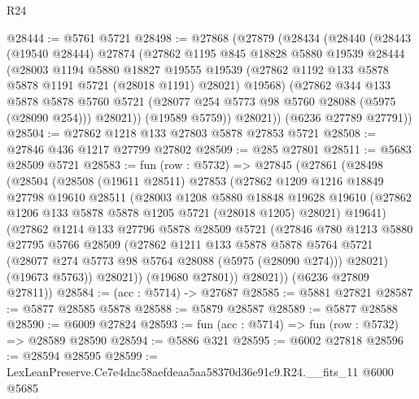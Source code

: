 \begin{lexlean}{R24}
\begin{coremodule}
@28444 := @5761 @5721
@28498 := @27868
    (@27879
      (@28434
        (@28440
          (@28443
            (@19540 @28444)
            @27874
            (@27862
              @1195
              @845
              @18828
              @5880
              @19539
              @28444
              (@28003
                @1194
                @5880
                @18827
                @19555
                @19539
                (@27862 @1192 @133 @5878 @5878 @1191 @5721 (@28018 @1191) @28021)
                @19568)
              (@27862
                @344
                @133
                @5878
                @5878
                @5760
                @5721
                (@28077 @254 @5773 @98 @5760 @28088 (@5975 (@28090 @254)))
                @28021))
            (@19589 @5759))
          @28021))
      (@6236 @27789 @27791))
@28504 := @27862 @1218 @133 @27803 @5878 @27853 @5721
@28508 := @27846 @436 @1217 @27799 @27802
@28509 := @285 @27801
@28511 := @5683 @28509 @5721
@28583 := fun (row : @5732) =>
  @27845
    (@27861
      (@28498
        (@28504
          (@28508
            (@19611 @28511)
            @27853
            (@27862
              @1209
              @1216
              @18849
              @27798
              @19610
              @28511
              (@28003
                @1208
                @5880
                @18848
                @19628
                @19610
                (@27862 @1206 @133 @5878 @5878 @1205 @5721 (@28018 @1205) @28021)
                @19641)
              (@27862
                @1214
                @133
                @27796
                @5878
                @28509
                @5721
                (@27846
                  @780
                  @1213
                  @5880
                  @27795
                  @5766
                  @28509
                  (@27862
                    @1211
                    @133
                    @5878
                    @5878
                    @5764
                    @5721
                    (@28077 @274 @5773 @98 @5764 @28088 (@5975 (@28090 @274)))
                    @28021)
                  (@19673 @5763))
                @28021))
            (@19680 @27801))
          @28021))
      (@6236 @27809 @27811))
@28584 := (acc : @5714) -> @27687
@28585 := @5881 @27821
@28587 := @5877 @28585 @5878
@28588 := @5879 @28587
@28589 := @5877 @28588
@28590 := @6009 @27824
@28593 := fun (acc : @5714) => fun (row : @5732) => @28589 @28590
@28594 := @5886 @321
@28595 := @6002 @27818
@28596 := @28594 @28595
@28599 := LexLeanPreserve.Ce7e4dac58aefdeaa5aa58370d36e91c9.R24.__fits_11 @6000 @5685

\end{coremodule}
\end{lexlean}
